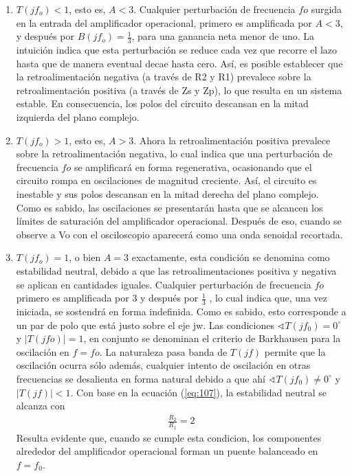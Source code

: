 \begin{enumerate}
\item  	$T(jf_o) < 1$, esto es, $A < 3 $. Cualquier perturbación de frecuencia $fo$ surgida en la
entrada del amplificador operacional, primero es amplificada por $A < 3$, y después por $B(jf_o) =\frac{1}{3}$,
para una ganancia neta menor de uno. La intuición indica que esta perturbación se reduce cada vez que recorre el lazo hasta que de manera eventual decae hasta cero. Así, es
posible establecer que la retroalimentación negativa (a través de R2 y R1) prevalece 
sobre la retroalimentación positiva (a través de Zs y Zp), lo que resulta en un sistema estable. En consecuencia, los polos del circuito descansan en la mitad izquierda del
plano complejo. 
\item 	 $T(jf_o) > 1$, esto es, $A> 3$. Ahora la retroalimentación positiva prevalece sobre la
retroalimentación negativa, lo cual indica que una perturbación de frecuencia $fo$ se amplificará en forma regenerativa, ocasionando que el circuito rompa en oscilaciones de
magnitud creciente. Así, el circuito es inestable y sus polos descansan en la mitad derecha del plano complejo. Como es sabido, las oscilaciones se presentarán hasta que se
alcancen los límites de saturación del amplificador operacional. Después de eso, cuando se observe a Vo
con el osciloscopio aparecerá como una onda senoidal recortada.
\item  $T(jf_o) = 1$, o bien $A= 3$ exactamente, esta condición se denomina como estabilidad
neutral, debido a que las retroalimentaciones positiva y negativa se aplican en cantidades iguales. Cualquier perturbación de frecuencia $fo$ primero es amplificada por 3  y
después por $\frac{1}{3}$ , lo cual indica que, una vez iniciada, se sostendrá en forma indefinida. Como es sabido, esto corresponde a un par de polo que está justo sobre el eje jw. Las
condiciones $\sphericalangle T(jf_0)= 0^\circ$ y $|T(jfo)|= 1$, en conjunto se denominan el criterio de
Barkhausen para la oscilación en $f=fo$. La naturaleza pasa banda de $T(jf)$ permite que la
oscilación ocurra sólo además, cualquier intento de oscilación en otras frecuencias se desalienta en forma natural debido a que ahí  $\sphericalangle T(jf_0) \neq 0^\circ$ y $|T(jf)| < 1$. Con base en la
ecuación (\ref{eq:107}), la estabilidad neutral se alcanza con 
\begin{align}
\frac{R_2}{R_1}=2
\end{align}
Resulta evidente que, cuando se cumple esta condicion, los componentes alrededor del amplificador operacional forman un puente balanceado en $f=f_0$.
\end{enumerate}
